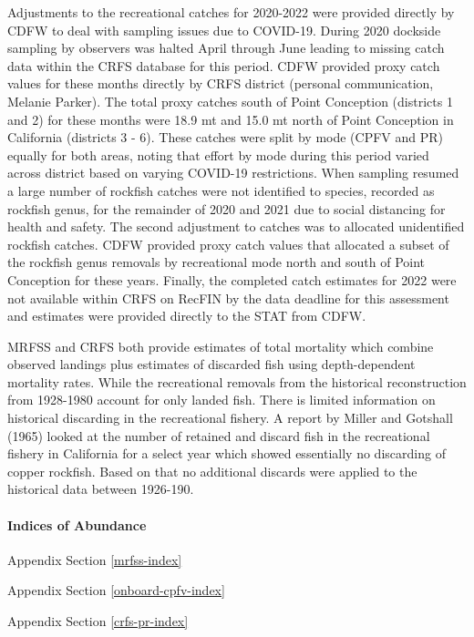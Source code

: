 \documentclass[11pt,
  english,
  letterpaper,
]{article}
\begin{document}
Adjustments to the recreational catches for 2020-2022 were provided directly by CDFW to deal with sampling issues due to COVID-19. During 2020 dockside sampling by observers was halted April through June leading to missing catch data within the CRFS database for this period. CDFW provided proxy catch values for these months directly by CRFS district (personal communication, Melanie Parker). The total proxy catches south of Point Conception (districts 1 and 2) for these months were 18.9 mt and 15.0 mt north of Point Conception in California (districts 3 - 6). These catches were split by mode (CPFV and PR) equally for both areas, noting that effort by mode during this period varied across district based on varying COVID-19 restrictions. When sampling resumed a large number of rockfish catches were not identified to species, recorded as rockfish genus, for the remainder of 2020 and 2021 due to social distancing for health and safety. The second adjustment to catches was to allocated unidentified rockfish catches. CDFW provided proxy catch values that allocated a subset of the rockfish genus removals by recreational mode north and south of Point Conception for these years. Finally, the completed catch estimates for 2022 were not available within CRFS on RecFIN by the data deadline for this assessment and estimates were provided directly to the STAT from CDFW.

MRFSS and CRFS both provide estimates of total mortality which combine observed landings plus estimates of discarded fish using depth-dependent mortality rates. While the recreational removals from the historical reconstruction from 1928-1980 account for only landed fish. There is limited information on historical discarding in the recreational fishery. A report by Miller and Gotshall (1965) looked at the number of retained and discard fish in the recreational fishery in California for a select year which showed essentially no discarding of copper rockfish. Based on that no additional discards were applied to the historical data between 1926-190.

\hypertarget{indices-of-abundance}{%
\paragraph{Indices of Abundance}\label{indices-of-abundance}}

Appendix Section \ref{mrfss-index}

Appendix Section \ref{onboard-cpfv-index}

Appendix Section \ref{crfs-pr-index}
\end{document}
